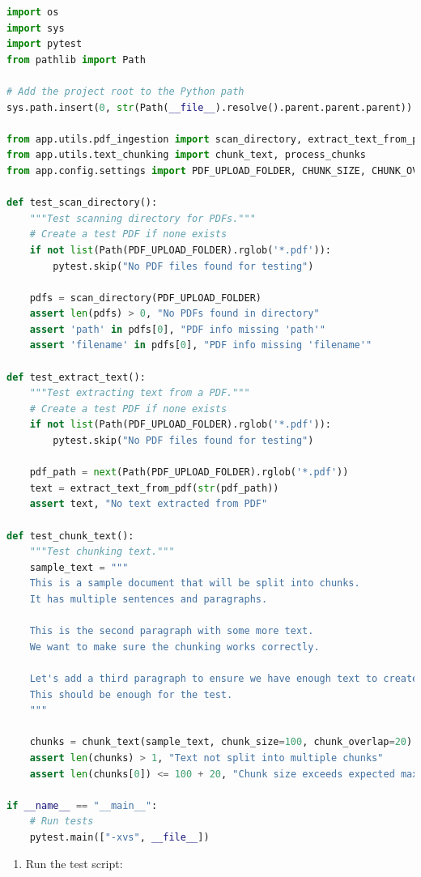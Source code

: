 \documentclass[
  screen,review,acmlarge]{acmart}
\providecommand{\tightlist}{%
  \setlength{\itemsep}{0pt}\setlength{\parskip}{0pt}}
\begin{document}
\begin{lstlisting}[language=Python]
import os
import sys
import pytest
from pathlib import Path

# Add the project root to the Python path
sys.path.insert(0, str(Path(__file__).resolve().parent.parent.parent))

from app.utils.pdf_ingestion import scan_directory, extract_text_from_pdf, process_pdfs
from app.utils.text_chunking import chunk_text, process_chunks
from app.config.settings import PDF_UPLOAD_FOLDER, CHUNK_SIZE, CHUNK_OVERLAP

def test_scan_directory():
    """Test scanning directory for PDFs."""
    # Create a test PDF if none exists
    if not list(Path(PDF_UPLOAD_FOLDER).rglob('*.pdf')):
        pytest.skip("No PDF files found for testing")
    
    pdfs = scan_directory(PDF_UPLOAD_FOLDER)
    assert len(pdfs) > 0, "No PDFs found in directory"
    assert 'path' in pdfs[0], "PDF info missing 'path'"
    assert 'filename' in pdfs[0], "PDF info missing 'filename'"

def test_extract_text():
    """Test extracting text from a PDF."""
    # Create a test PDF if none exists
    if not list(Path(PDF_UPLOAD_FOLDER).rglob('*.pdf')):
        pytest.skip("No PDF files found for testing")
    
    pdf_path = next(Path(PDF_UPLOAD_FOLDER).rglob('*.pdf'))
    text = extract_text_from_pdf(str(pdf_path))
    assert text, "No text extracted from PDF"
    
def test_chunk_text():
    """Test chunking text."""
    sample_text = """
    This is a sample document that will be split into chunks.
    It has multiple sentences and paragraphs.
    
    This is the second paragraph with some more text.
    We want to make sure the chunking works correctly.
    
    Let's add a third paragraph to ensure we have enough text to create multiple chunks.
    This should be enough for the test.
    """
    
    chunks = chunk_text(sample_text, chunk_size=100, chunk_overlap=20)
    assert len(chunks) > 1, "Text not split into multiple chunks"
    assert len(chunks[0]) <= 100 + 20, "Chunk size exceeds expected maximum"

if __name__ == "__main__":
    # Run tests
    pytest.main(["-xvs", __file__])
\end{lstlisting}

\begin{enumerate}
\def\labelenumi{\arabic{enumi}.}
\setcounter{enumi}{6}
\tightlist
\item
  Run the test script:
\end{enumerate}
\end{document}
